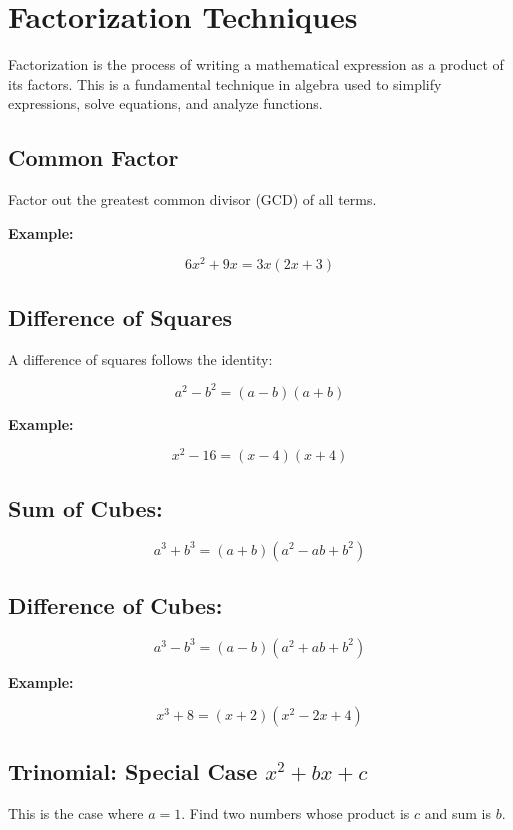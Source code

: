 \newpage
\section{Factorization Techniques}

Factorization is the process of writing a mathematical expression as a product 
of its factors. This is a fundamental technique in algebra used to simplify expressions, 
solve equations, and analyze functions.

\subsection{Common Factor}

Factor out the greatest common divisor (GCD) of all terms.

\textbf{Example:}

\[
  6x^2 + 9x = 3x(2x + 3)
\]

\subsection{Difference of Squares}

A difference of squares follows the identity:

\[
  a^2 - b^2 = (a - b)(a + b)
\]

\textbf{Example:}

\[
  x^2 - 16 = (x - 4)(x + 4)
\]

\subsection{Sum of Cubes:}

\[
  a^3 + b^3 = (a + b)(a^2 - ab + b^2)
\]

\subsection{Difference of Cubes:}

\[
  a^3 - b^3 = (a - b)(a^2 + ab + b^2)
\]

\textbf{Example:}

\[
  x^3 + 8 = (x + 2)(x^2 - 2x + 4)
\]

\subsection{Trinomial: Special Case \texorpdfstring{\(x^2 + bx + c\)}{x² + bx + c}}

This is the case where \(a = 1\). Find two numbers whose product is \(c\) and sum is \(b\).

